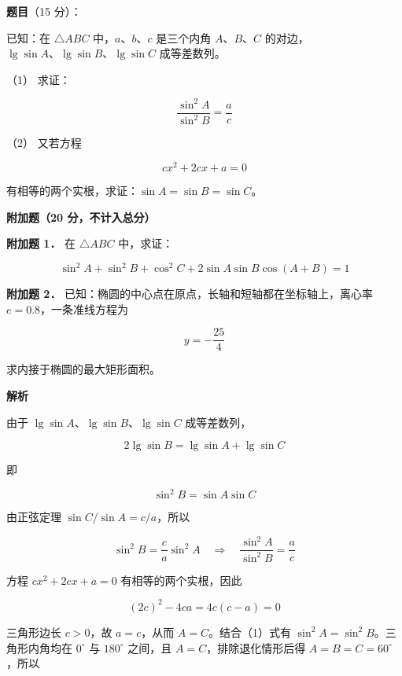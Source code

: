 \begin{answer}

\textbf{题目}（15 分）：

已知：在 $\triangle ABC$ 中，$a\text{、}b\text{、}c$ 是三个内角 $A\text{、}B\text{、}C$ 的对边，$\lg\sin A\text{、}\lg\sin B\text{、}\lg\sin C$ 成等差数列。

（1） 求证：

\nopagebreak[4]
\[
\frac{\sin^2A}{\sin^2B}=\frac ac
\]

（2） 又若方程

\nopagebreak[4]
\[
cx^2+2cx+a=0
\]

有相等的两个实根，求证：$\sin A=\sin B=\sin C$。

\begin{gktip}
\textbf{附加题（20 分，不计入总分）}
\end{gktip}

\textbf{附加题 1．} 在 $\triangle ABC$ 中，求证：

\nopagebreak[4]
\[
\sin^2A+\sin^2B+\cos^2C+2\sin A\sin B\cos(A+B)=1
\]

\textbf{附加题 2．} 已知：椭圆的中心点在原点，长轴和短轴都在坐标轴上，离心率 $e=0.8$，一条准线方程为

\nopagebreak[4]
\[
y=-\frac{25}{4}
\]

求内接于椭圆的最大矩形面积。

\textbf{解析}


由于 $\lg\sin A$、$\lg\sin B$、$\lg\sin C$ 成等差数列，

\nopagebreak[4]
\[
2\lg\sin B=\lg\sin A+\lg\sin C
\]

即

\nopagebreak[4]
\[
\sin^2B=\sin A\sin C
\]

由正弦定理 $\sin C/\sin A=c/a$，所以

\nopagebreak[4]
\[
\sin^2B=\frac ca\sin^2A
\quad\Longrightarrow\quad
\frac{\sin^2A}{\sin^2B}=\frac ac
\]


方程 $cx^2+2cx+a=0$ 有相等的两个实根，因此

\nopagebreak[4]
\[
(2c)^2-4ca=4c(c-a)=0
\]

三角形边长 $c>0$，故 $a=c$，从而 $A=C$。结合（1）式有 $\sin^2A=\sin^2B$。三角形内角均在 $0^\circ$ 与 $180^\circ$ 之间，且 $A=C$，排除退化情形后得 $A=B=C=60^\circ$，所以


\end{answer}
